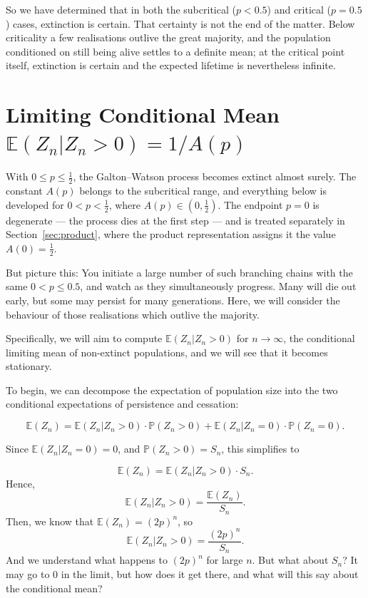 So we have determined that in both the subcritical ($p<0.5$) and critical ($p=0.5$) cases, extinction is certain. That certainty is not the end of the matter. Below criticality a few realisations outlive the great majority, and the population conditioned on still being alive settles to a definite mean; at the critical point itself, extinction is certain and the expected lifetime is nevertheless infinite.


\section{Limiting Conditional Mean \texorpdfstring{$\mathbb{E}(Z_n|Z_n>0) = 1/A(p)$}{E(Zn|Zn>0) = 1/A(p)}}
\label{sec:limcondmean}


With $0 \le p \le \tfrac12$, the Galton--Watson process becomes extinct almost surely. The constant $A(p)$ belongs to the subcritical range, and everything below is developed for $0<p<\tfrac12$, where $A(p)\in(0,\tfrac12)$. The endpoint $p=0$ is degenerate --- the process dies at the first step --- and is treated separately in Section~\ref{sec:product}, where the product representation assigns it the value $A(0)=\tfrac12$.

But picture this: You 
initiate a large number of such branching chains with the same $0<p\leq 0.5$, and watch as they simultaneously progress.
Many will die out early, but some may persist for many generations. Here, we will consider the behaviour of those realisations
which outlive the majority. 

Specifically, we will aim to compute $\mathbb{E}(Z_n|Z_n>0)$ for $n\to \infty$, the conditional limiting mean 
of non-extinct populations, and we will see that it becomes stationary.

\vspace{20pt}

\noindent
To begin, we can decompose the expectation of population size into the two conditional expectations of persistence and cessation: 

$$\mathbb{E}(Z_n) = \mathbb{E}(Z_n|Z_n>0)\cdot\mathbb{P}(Z_n>0) + \mathbb{E}(Z_n|Z_n=0)\cdot\mathbb{P}(Z_n=0).$$

\noindent
Since $\mathbb{E}(Z_n|Z_n=0) = 0$, and $\mathbb{P}(Z_n > 0) = S_n$, this simplifies to

$$\mathbb{E}(Z_n) = \mathbb{E}(Z_n|Z_n>0)\cdot S_n.$$
Hence,
$$\mathbb{E}(Z_n|Z_n>0) = \frac{\mathbb{E}(Z_n)}{S_n}.$$
Then, we know that $\mathbb{E}(Z_n) = (2p)^n$, so
$$\mathbb{E}(Z_n|Z_n>0) = \frac{(2p)^n}{S_n}.$$
And we understand what happens to $(2p)^n$ for large $n$. But what about $S_n$? It may go to 0 in the limit, but how does it get there, and what will this say about the conditional mean?




